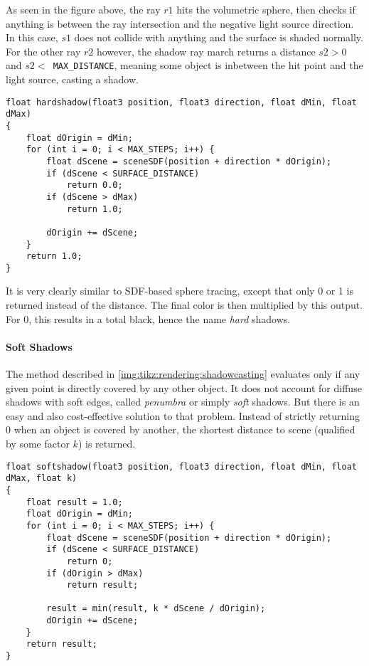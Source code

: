 \noindent
As seen in the figure above, the ray $r1$ hits the volumetric sphere, then checks if anything is between the ray intersection and the negative light source direction.
In this case, $s1$ does not collide with anything and the surface is shaded normally. 
For the other ray $r2$ however, the shadow ray march returns a distance $s2 > 0$ and $s2 < $\lstinline[language=HLSL]{ MAX_DISTANCE}, meaning some object is inbetween the hit point and the light source, casting a shadow.
\\
\begin{lstlisting}[language=HLSL, caption=Implementation of hard shadow casting., label=lst:shader:shadowcasting:hard]
float hardshadow(float3 position, float3 direction, float dMin, float dMax)
{
    float dOrigin = dMin;
    for (int i = 0; i < MAX_STEPS; i++) {
        float dScene = sceneSDF(position + direction * dOrigin);
        if (dScene < SURFACE_DISTANCE)
            return 0.0;
        if (dScene > dMax)
            return 1.0;
        
        dOrigin += dScene;
    }
    return 1.0;
}
\end{lstlisting}

\noindent
It is very clearly similar to SDF-based sphere tracing, except that only 0 or 1 is returned instead of the distance.
The final color is then multiplied by this output. For 0, this results in a total black, hence the name \textit{hard} shadows.

\paragraph{Soft Shadows}
The method described in \autoref{img:tikz:rendering:shadowcasting} evaluates only if any given point is directly covered by any other object. 
It does not account for diffuse shadows with soft edges, called \textit{\gls{penumbra}} or simply \textit{soft} shadows. But there is an easy and also cost-effective solution to that problem.
Instead of strictly returning 0 when an object is covered by another, the shortest distance to scene (qualified by some factor $k$) is returned.

\begin{lstlisting}[language=HLSL, caption=Implementation of hard shadow casting., label=lst:shader:shadowcasting:soft]
float softshadow(float3 position, float3 direction, float dMin, float dMax, float k)
{
    float result = 1.0;
    float dOrigin = dMin;
    for (int i = 0; i < MAX_STEPS; i++) {
        float dScene = sceneSDF(position + direction * dOrigin);
        if (dScene < SURFACE_DISTANCE)
            return 0;
        if (dOrigin > dMax)
            return result;
        
        result = min(result, k * dScene / dOrigin);
        dOrigin += dScene;
    }
    return result;
}
\end{lstlisting}

